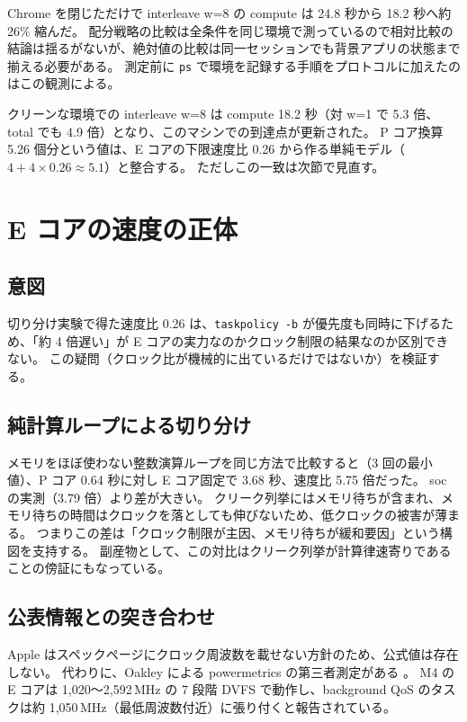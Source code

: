 Chrome を閉じただけで interleave w=8 の compute は 24.8 秒から 18.2 秒へ約 26\% 縮んだ。
配分戦略の比較は全条件を同じ環境で測っているので相対比較の結論は揺るがないが、絶対値の比較は同一セッションでも背景アプリの状態まで揃える必要がある。
測定前に \texttt{ps} で環境を記録する手順をプロトコルに加えたのはこの観測による。

クリーンな環境での interleave w=8 は compute 18.2 秒（対 w=1 で 5.3 倍、total でも 4.9 倍）となり、このマシンでの到達点が更新された。
P コア換算 5.26 個分という値は、E コアの下限速度比 0.26 から作る単純モデル（$4 + 4\times0.26 \approx 5.1$）と整合する。
ただしこの一致は次節で見直す。

\section{E コアの速度の正体}
\label{sec:ecore-speed}

\subsection{意図}

切り分け実験で得た速度比 0.26 は、\texttt{taskpolicy -b} が優先度も同時に下げるため、「約 4 倍遅い」が E コアの実力なのかクロック制限の結果なのか区別できない。
この疑問（クロック比が機械的に出ているだけではないか）を検証する。

\subsection{純計算ループによる切り分け}

メモリをほぼ使わない整数演算ループを同じ方法で比較すると（3 回の最小値）、P コア 0.64 秒に対し E コア固定で 3.68 秒、速度比 5.75 倍だった。
soc の実測（3.79 倍）より差が大きい。
クリーク列挙にはメモリ待ちが含まれ、メモリ待ちの時間はクロックを落としても伸びないため、低クロックの被害が薄まる。
つまりこの差は「クロック制限が主因、メモリ待ちが緩和要因」という構図を支持する。
副産物として、この対比はクリーク列挙が計算律速寄りであることの傍証にもなっている。

\subsection{公表情報との突き合わせ}

Apple はスペックページにクロック周波数を載せない方針のため、公式値は存在しない。
代わりに、Oakley による powermetrics の第三者測定がある \cite{oakley2024}。
M4 の E コアは 1{,}020〜2{,}592\,MHz の 7 段階 DVFS で動作し、background QoS のタスクは約 1{,}050\,MHz（最低周波数付近）に張り付くと報告されている。

